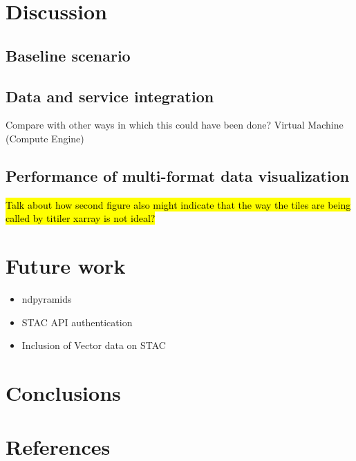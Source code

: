 \documentclass[
  oneside,
  open=any]{scrbook}
\providecommand{\tightlist}{%
  \setlength{\itemsep}{0pt}\setlength{\parskip}{0pt}}\usepackage{longtable,booktabs,array}
\begin{document}
\chapter{Discussion}\label{discussion}

\section{Baseline scenario}\label{baseline-scenario-1}

\section{Data and service
integration}\label{data-and-service-integration-1}

Compare with other ways in which this could have been done? Virtual
Machine (Compute Engine)

\section{Performance of multi-format data
visualization}\label{performance-of-multi-format-data-visualization-1}

\hl{Talk about how second figure also might indicate that the way the tiles are being called by titiler xarray is not ideal?}

\chapter{Future work}\label{future-work}

\begin{itemize}
\tightlist
\item
  ndpyramids
\item
  STAC API authentication
\item
  Inclusion of Vector data on STAC
\end{itemize}

\chapter{Conclusions}\label{conclusions}

\chapter*{References}\label{references}
\end{document}
